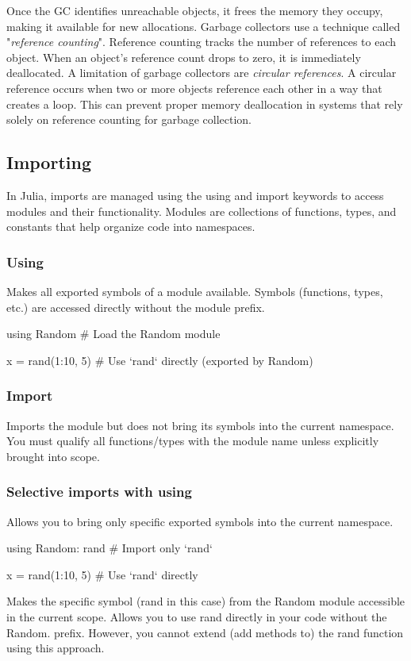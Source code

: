 \documentclass{report}
\begin{document}
    Once the GC identifies unreachable objects, it frees the memory they occupy, making it available for new allocations.
    \bigbreak \noindent 
    Garbage collectors use a technique called "\textit{reference counting}". Reference counting tracks the number of references to each object. When an object's reference count drops to zero, it is immediately deallocated.
    \bigbreak \noindent 
    A limitation of garbage collectors are \textit{circular references}. A circular reference occurs when two or more objects reference each other in a way that creates a loop. This can prevent proper memory deallocation in systems that rely solely on reference counting for garbage collection.

    \bigbreak \noindent 
    \subsection{Importing}
    \bigbreak \noindent 
    In Julia, imports are managed using the using and import keywords to access modules and their functionality. Modules are collections of functions, types, and constants that help organize code into namespaces.
    \bigbreak \noindent 
    \subsubsection{Using}
    \bigbreak \noindent 
    Makes all exported symbols of a module available. Symbols (functions, types, etc.) are accessed directly without the module prefix.
    \bigbreak \noindent 
    \begin{jlcode}
    using Random  # Load the Random module

    x = rand(1:10, 5)  # Use `rand` directly (exported by Random)
    \end{jlcode}
    \bigbreak \noindent 
    \subsubsection{Import}
    \bigbreak \noindent 
    Imports the module but does not bring its symbols into the current namespace.
    \bigbreak \noindent 
    You must qualify all functions/types with the module name unless explicitly brought into scope.

    \bigbreak \noindent 
    \subsubsection{Selective imports with using}
    \bigbreak \noindent 
    Allows you to bring only specific exported symbols into the current namespace.
    \bigbreak \noindent 
    \begin{jlcode}
        using Random: rand  # Import only `rand`

        x = rand(1:10, 5)  # Use `rand` directly
    \end{jlcode}
    \bigbreak \noindent 
    Makes the specific symbol (rand in this case) from the Random module accessible in the current scope. Allows you to use rand directly in your code without the Random. prefix.
    \bigbreak \noindent 
    However, you cannot extend (add methods to) the rand function using this approach.
\end{document}
